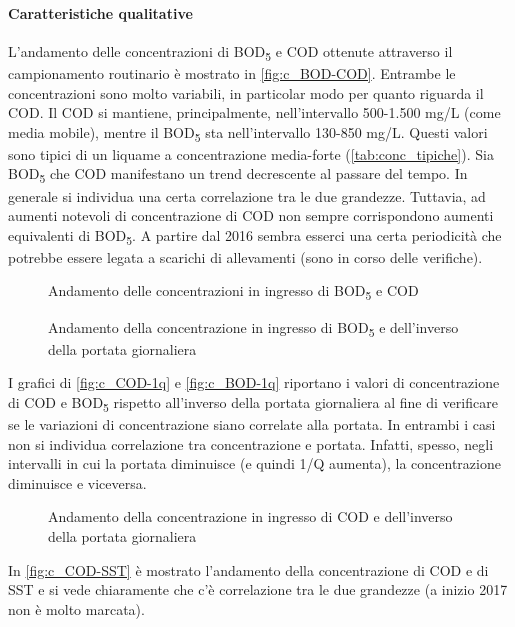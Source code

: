 \paragraph{Caratteristiche qualitative}

L’andamento delle concentrazioni di BOD\textsubscript{5} e COD ottenute attraverso il campionamento routinario è mostrato in \autoref{fig:c_BOD-COD}.
Entrambe le concentrazioni sono molto variabili, in particolar modo per quanto riguarda il COD. Il COD si mantiene, principalmente, nell'intervallo 500-1.500 mg/L (come media mobile), mentre il BOD\textsubscript{5} sta nell'intervallo 130-850 mg/L. Questi valori sono tipici di un liquame a concentrazione media-forte (\autoref{tab:conc_tipiche}).
Sia BOD\textsubscript{5} che COD manifestano un trend decrescente al passare del tempo. In generale si individua una certa correlazione tra le due grandezze. Tuttavia, ad aumenti notevoli di concentrazione di COD non sempre corrispondono aumenti equivalenti di BOD\textsubscript{5}.
A partire dal 2016 sembra esserci una certa periodicità che potrebbe essere legata a scarichi di allevamenti (sono in corso delle verifiche).
\begin{figure}[H]
		\centering
	\caption{Andamento delle concentrazioni in ingresso di BOD\textsubscript{5} e COD}
	\label{fig:c_BOD-COD}
\end{figure}
\begin{figure}[H]
		\centering
	\caption{Andamento della concentrazione in ingresso di BOD\textsubscript{5} e dell'inverso della portata giornaliera}
	\label{fig:c_BOD-1q}
\end{figure}
I grafici di \autoref{fig:c_COD-1q} e \autoref{fig:c_BOD-1q} riportano i valori di concentrazione di COD e BOD\textsubscript{5} rispetto all’inverso della portata giornaliera al fine di verificare se le variazioni di concentrazione siano correlate alla portata.
In entrambi i casi non si individua correlazione tra concentrazione e portata. Infatti, spesso, negli intervalli in cui la portata diminuisce (e quindi 1/Q aumenta), la concentrazione diminuisce e viceversa.
\begin{figure}[H]
		\centering
	\caption{Andamento della concentrazione in ingresso di COD e dell'inverso della portata giornaliera}
	\label{fig:c_COD-1q}
\end{figure}


In \autoref{fig:c_COD-SST} è mostrato l’andamento della concentrazione di COD e di SST e si vede chiaramente che c’è correlazione tra le due grandezze (a inizio 2017 non è molto marcata).

